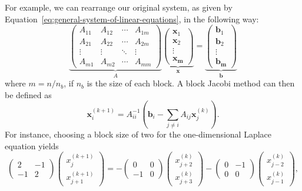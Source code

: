 For example, we can rearrange our original system, as given by Equation~\eqref{eq:general-system-of-linear-equations}, in the following way:
\begin{equation}
\underbrace{
\begin{pmatrix}A_{11}&A_{12}&\cdots &A_{1m}\\A_{21}&A_{22}&\cdots &A_{2m}\\\vdots &\vdots &\ddots &\vdots \\A_{m1}&A_{m2}&\cdots &A_{mm}\end{pmatrix}}_{A}
\underbrace{
\begin{pmatrix}
\bm{x}_1 \\ \bm{x}_2 \\ \vdots \\ \bm{x_m} 
\end{pmatrix}}_{\bm{x}} =
\underbrace{
\begin{pmatrix}
	\bm{b}_1 \\ \bm{b}_2 \\ \vdots \\ \bm{b_m} 
\end{pmatrix}}_{\bm{b}}
\end{equation}
where $m = n / n_b$, if $n_b$ is the size of each block.
A block Jacobi method can then be defined as
\begin{equation}
	\bm{x}_{i}^{(k+1)}=A_{ii}^{-1}\left(\bm{b}_{i}-\sum _{j\neq i}A_{ij}\bm{x}_{j}^{(k)}\right).
	\label{eq:jacobi-block-wise}
\end{equation}
For instance, choosing a block size of two for the one-dimensional Laplace equation yields
\begin{equation}
	\begin{pmatrix}
		2 & -1 \\
		-1 & 2
	\end{pmatrix}
	\begin{pmatrix}
		x_{j}^{(k+1)} \\ x_{j+1}^{(k+1)} 
	\end{pmatrix}
= 	-  \begin{pmatrix}
	0 & 0 \\
	-1 & 0
\end{pmatrix} 	
\begin{pmatrix}
x_{j+2}^{(k)} \\ x_{j+3}^{(k)}
\end{pmatrix} -
\begin{pmatrix}
	0 & -1 \\
	0 & 0
\end{pmatrix} 	
\begin{pmatrix}
	x_{j-2}^{(k)} \\ x_{j-1}^{(k)} 
\end{pmatrix},
\end{equation}
